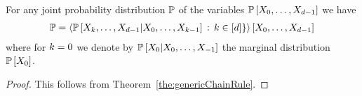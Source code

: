 \begin{theorem}\label{the:chainRule}
	For any joint probability distribution $\mathbb{P}$ of the variables $\mathbb{P}\left[X_{0},\ldots,X_{d-1}\right]$ we have
	\begin{align*}
		\mathbb{P} = \left\langle \mathbb{P}\left[X_{k},\ldots,X_{d-1}|X_{0},\ldots,X_{k-1}\right]\, : \, k\in[d]\}\right\rangle \left[ X_{0},\ldots,X_{d-1} \right] 
	\end{align*}
	where for $k=0$ we denote by $ \mathbb{P}\left[X_{0}|X_{0},\ldots,X_{-1}\right]$ the marginal distribution $\mathbb{P}\left[X_{0}\right]$.
\end{theorem}
\begin{proof}
	This follows from Theorem~\ref{the:genericChainRule}.
\end{proof}







